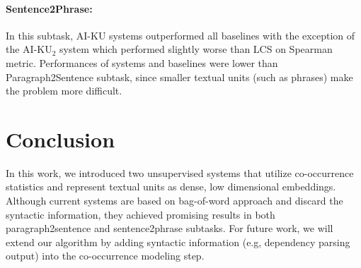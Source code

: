 \documentclass[11pt]{article}
\begin{document}
\begin{table}[hr]
\begin{center}
\end{center}
\caption{\label{table:results-s2p} Sentence2phrase subtask scores for the test data.}
\end{table}

\paragraph{Sentence2Phrase:} In this subtask, AI-KU systems outperformed all baselines with the exception of the AI-KU$_2$ system which performed slightly worse than LCS on Spearman metric. Performances of systems and baselines were lower than Paragraph2Sentence subtask, since smaller textual units (such as phrases) make the problem more difficult.

\section{Conclusion}
\label{conclusion}

In this work, we introduced two unsupervised systems that utilize co-occurrence statistics and represent textual units as dense, low dimensional embeddings. 
Although current systems are based on bag-of-word approach and discard the syntactic information, they achieved promising results in both paragraph2sentence and sentence2phrase subtasks. For future work, we will extend our algorithm by adding syntactic information (e.g, dependency parsing output) into the co-occurrence modeling step.



% 




\end{document}
